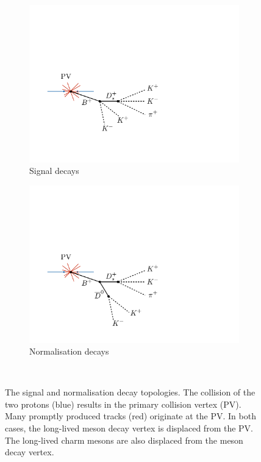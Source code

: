\begin{figure}[!h]
    \centering
    \begin{subfigure}[t]{0.4\textwidth}
        \includegraphics[width=1.0\textwidth]{figs/Selection/B2DsKK_topology.pdf}
        \caption{Signal decays}
    \end{subfigure}%
    \begin{subfigure}[t]{0.4\textwidth}
        \includegraphics[width=1.0\textwidth]{figs/Selection/B2DsD0_topology.pdf}
        \caption{Normalisation decays}
    \end{subfigure}\\
    \caption{The signal and normalisation decay topologies. The collision of the two protons (blue) results in the primary collision vertex (PV). Many promptly produced tracks (red) originate at the PV. In both cases, the long-lived \Bp meson decay vertex is displaced from the PV. The long-lived charm mesons are also displaced from the \Bp meson decay vertex.}
    \label{fig:topo}   
\end{figure}


